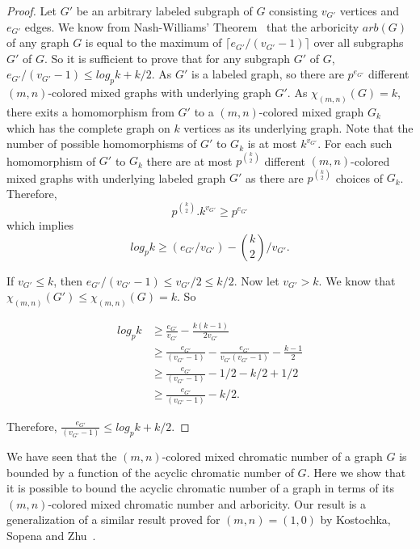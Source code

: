 \documentclass[11pt]{article}
\begin{document}
\begin{proof}
Let $G'$ be an arbitrary labeled subgraph of $G$ consisting $v_{G'}$ vertices and $e_{G'}$ edges. We know from 
Nash-Williams' Theorem~\cite{nash1page}  that the arboricity $arb(G)$ of any graph $G$ is equal to the maximum of 
$\lceil e_{G'}/(v_{G'} - 1) \rceil$ over all subgraphs $G'$ of $G$. So it is sufficient to prove that for any subgraph $G'$ of $G$, 
$e_{G'}/(v_{G'} - 1) \leq log_p k + k/2$. 
As $G'$ is a labeled graph, so there are $p^{e_{G'}}$ different $(m,n)$-colored mixed graphs with underlying graph $G'$. As $\chi_{(m,n)}(G) = k$, there exits a homomorphism from $G'$ to a $(m, n)$-colored mixed graph $G_k$ which has the complete graph on $k$ vertices as its underlying graph. 
Note that the number of possible homomorphisms of $G'$ to $G_k$ is at most $k^{v_{G'}}$.
For each such homomorphism of  $G'$ to $G_k$ there are at most $p^{k \choose 2}$ different $(m,n)$-colored mixed graphs with underlying labeled graph  $G'$ as there are $p^{k \choose 2}$ choices of $G_k$. 
Therefore,
\begin{equation}\label{eqn wolog}
p^{k \choose 2}. k^{v_{G'}} \geq p^{e_{G'}}
\end{equation}
  which implies 
  \begin{equation}\label{eqn wlog}
   log_p k \geq (e_{G'}/v_{G'}) - {k \choose 2} / v_{G'}.
\end{equation}  

If $v_{G'} \leq k$, then $e_{G'}/(v_{G'} - 1) \leq v_{G'}/2 \leq k/2$. Now let $v_{G'} > k$. We know that $\chi_{(m,n)}(G') \leq \chi_{(m,n)}(G) = k$. So

\begin{equation*} \label{.}
\begin{split}
log_p k & \geq \frac{e_{G'}}{v_{G'}} - \frac{k(k - 1)}{2 v_{G'}} \\
 & \geq \frac{e_{G'}}{(v_{G'} -1)} - \frac{e_{G'}}{v_{G'}(v_{G'} - 1)} - \frac{k - 1}{2} \\
 & \geq \frac{e_{G'}}{(v_{G'} -1)} - 1/2 - k/2 + 1/2 \\
 & \geq \frac{e_{G'}}{(v_{G'} -1)} - k/2.
\end{split}
\end{equation*}

Therefore, $\frac{e_{G'}}{(v_{G'} -1)} \leq log_{p}k +k/2$. 
\end{proof}


We have seen that the $(m,n)$-colored mixed chromatic number of a graph $G$ is bounded by a function of the acyclic chromatic number of $G$. Here we show that
 it is possible to bound the acyclic chromatic number of a graph in terms of its $(m,n)$-colored mixed chromatic number and arboricity.
Our result is a generalization of a similar result proved for $(m,n) =(1,0)$ by  Kostochka, Sopena and Zhu~\cite{Kostochka97acyclicand}. 
\end{document}
